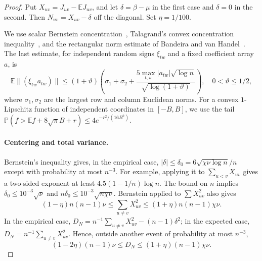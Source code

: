 \documentclass[11pt,a4paper]{article}
\theoremstyle{definition}
\theoremstyle{remark}
\newcommand{\E}{\mathbb E}
\newcommand{\Prb}{\mathbb P}
\begin{document}
\begin{proof}
Put $X_{uv}=J_{uv}-\E J_{uv}$, and let $\delta=\beta-\mu$ in the first
case and $\delta=0$ in the second. Then $N_{uv}=X_{uv}-\delta$ off the
diagonal. Set $\eta=1/100$.

We use scalar Bernstein concentration~\cite{BLM13}, Talagrand's convex
concentration inequality~\cite{Tal95}, and the rectangular norm estimate
of Bandeira and van Handel~\cite[Theorem~3.1 and Corollary~3.2]{BvH16}.
The last estimate, for independent random signs $\xi_{tw}$ and a fixed
coefficient array $a$, is
\[
 \E\|(\xi_{tw}a_{tw})\|
 \le(1+\vartheta)\left(\sigma_1+\sigma_2+
       \frac{5\max_{t,w}|a_{tw}|\sqrt{\log n}}
            {\sqrt{\log(1+\vartheta)}}\right),\quad
 0<\vartheta\le1/2,
\]
where $\sigma_1,\sigma_2$ are the largest row and column Euclidean norms.
For a convex $1$-Lipschitz function of independent coordinates in $[-B,B]$,
we use the tail
$\Prb(f>\E f+8\sqrt\pi B+r)\le4e^{-r^2/(16B^2)}$.

\paragraph{Centering and total variance.}
Bernstein's inequality gives, in the empirical case,
$|\delta|\le\delta_0=6\sqrt{\chi\nu\log n}/n$ except with probability
at most $n^{-3}$. For example, applying it to
$\sum_{u<v}X_{uv}$ gives a two-sided exponent at least
$4.5(1-1/n)\log n$. The bound on $n$ implies
$\delta_0\le10^{-3}\sqrt\nu$ and
$n\delta_0\le10^{-3}\sqrt{n\chi\nu}$.
Bernstein applied to $\sum X_{uv}^2$ also gives
\[
 (1-\eta)n(n-1)\nu\le\sum_{u\ne v}X_{uv}^2
           \le(1+\eta)n(n-1)\chi\nu.
\]
In the empirical case,
$D_N=n^{-1}\sum_{u\ne v}X_{uv}^2-(n-1)\delta^2$; in the expected case,
$D_N=n^{-1}\sum_{u\ne v}X_{uv}^2$. Hence, outside another event of
probability at most $n^{-3}$,
\begin{equation}
 (1-2\eta)(n-1)\nu\le D_N\le(1+\eta)(n-1)\chi\nu. \label{eq:random-D}
\end{equation}


\end{proof}
\end{document}
